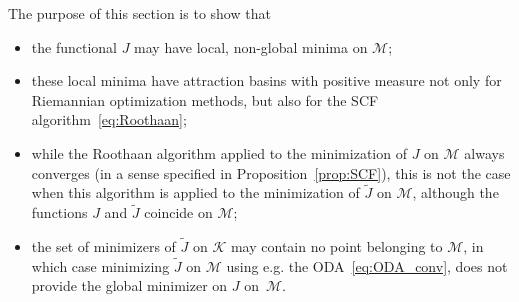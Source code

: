 \documentclass{article}
\newcommand{\1}{{\mathds 1}}
\begin{document}
The purpose of this section is to show that 
\begin{itemize}
\item the functional $J$ may have local, non-global minima on $\mathcal M$;
\item these local minima have attraction basins with positive measure not only for Riemannian optimization methods, but also for the SCF algorithm~\eqref{eq:Roothaan};
\item while the Roothaan algorithm applied to the minimization of $J$ on $\mathcal M$ always converges (in a sense specified in Proposition~\eqref{prop:SCF}), this is not the case when this algorithm is applied to the minimization of $\widetilde J$ on $\mathcal M$, although the functions $J$ and $\widetilde J$ coincide on $\mathcal M$;
\item the set of minimizers of $\widetilde J$ on $\mathcal K$ may contain no point belonging to $\mathcal M$, in which case minimizing $\widetilde J$ on $\mathcal M$ using e.g. the ODA~\eqref{eq:ODA_conv}, does not provide the global minimizer on $J$ on~$\mathcal M$.
\end{itemize}

\medskip
\end{document}
